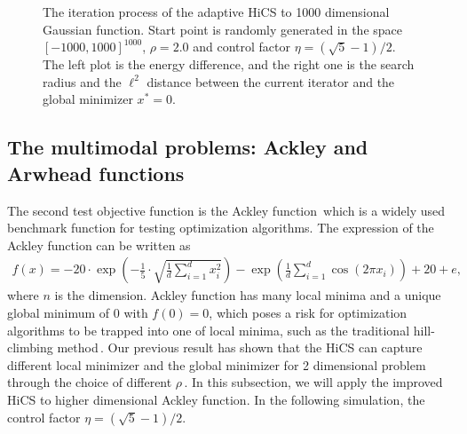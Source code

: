 \documentclass[mathpazo]{csam}
\theoremstyle{remark}
\begin{document}
\begin{figure}[!htbp]
\begin{minipage}[b]{0.5\linewidth}
{	  }
	\end{minipage}
	  \caption{The iteration process of the adaptive HiCS to 1000
	  dimensional Gaussian function. 
	  Start point is randomly generated in the space $[-1000,
	  1000]^{1000}$, $\rho=2.0$ and control factor
	  $\eta=(\sqrt{5}-1)/2$. The left plot is the energy
	  difference, and the right one is the search radius and 
	  the $\ell^2$ distance between the current iterator and the
	  global minimizer $x^*=0$.
	  } 
	  \label{fig:gauss:1000D}
\end{figure}

\subsection{The multimodal problems: Ackley and Arwhead functions}
\label{subsec:minmulit}

The second test objective function is the Ackley
function\,\cite{dieterich2012empirical} which is a widely used 
benchmark function for testing optimization algorithms.
The expression of the Ackley function can be written as
\begin{align}
	f(x) =
	-20\cdot\exp\left(-\frac{1}{5}\cdot\sqrt{\frac{1}{d}\sum_{i=1}^d
	x_i^2}\right)-
	\exp\left(\frac{1}{d}\sum_{i=1}^d \cos(2\pi x_i)\right)+20+e,
	\label{eqn:ackley}
\end{align}
where $n$ is the dimension.
Ackley function has many local minima and a unique global
minimum of $0$ with $f(0)=0$, which poses a risk for
optimization algorithms to be trapped into one of local
minima, such as the traditional hill-climbing method\,\cite{back1996evolutionary}.
Our previous result has shown that the HiCS can capture
different local minimizer and the global minimizer for 2
dimensional problem through the choice of different $\rho$\,\cite{huang2017hill}.
In this subsection, we will apply the improved HiCS
to higher dimensional Ackley function. 
In the following simulation, the control factor
$\eta=(\sqrt{5}-1)/2$.
\end{document}
